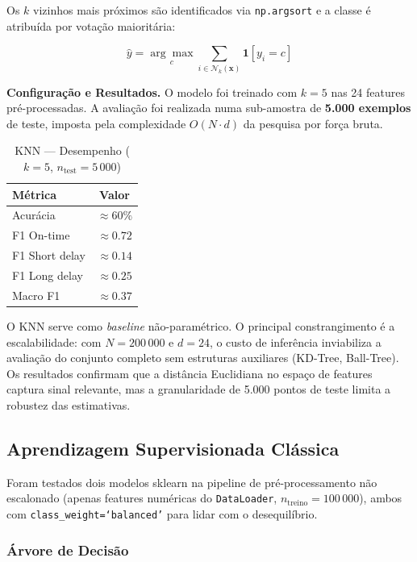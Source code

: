 \documentclass[conference]{IEEEtran}
\begin{document}
Os $k$ vizinhos mais próximos são identificados via \texttt{np.argsort} e a classe é
atribuída por votação maioritária:

\begin{equation}
\hat{y} = \underset{c}{\arg\max} \sum_{i \in \mathcal{N}_k(\mathbf{x})} \mathbf{1}[y_i = c]
\end{equation}

\textbf{Configuração e Resultados.} O modelo foi treinado com $k = 5$ nas 24 features
pré-processadas. A avaliação foi realizada numa sub-amostra de \textbf{5.000 exemplos}
de teste, imposta pela complexidade $O(N \cdot d)$ da pesquisa por força bruta.

\begin{table}[h]
\centering
\caption{KNN — Desempenho ($k=5$, $n_{\text{test}}=5\,000$)}
\label{tab:knn}
\begin{tabular}{lc}
\toprule
\textbf{Métrica} & \textbf{Valor} \\
\midrule
Acurácia       & $\approx 60\%$ \\
F1 On-time     & $\approx 0.72$ \\
F1 Short delay & $\approx 0.14$ \\
F1 Long delay  & $\approx 0.25$ \\
Macro F1       & $\approx 0.37$ \\
\bottomrule
\end{tabular}
\end{table}

O KNN serve como \textit{baseline} não-paramétrico. O principal constrangimento é a
escalabilidade: com $N = 200\,000$ e $d = 24$, o custo de inferência inviabiliza a
avaliação do conjunto completo sem estruturas auxiliares (KD-Tree, Ball-Tree). Os
resultados confirmam que a distância Euclidiana no espaço de features captura sinal
relevante, mas a granularidade de 5.000 pontos de teste limita a robustez das estimativas.

\subsection{Aprendizagem Supervisionada Clássica}

Foram testados dois modelos sklearn na pipeline de pré-processamento não escalonado
(apenas features numéricas do \texttt{DataLoader}, $n_{\text{treino}} = 100\,000$),
ambos com \texttt{class\_weight=`balanced'} para lidar com o desequilíbrio.

\subsubsection{Árvore de Decisão}
\end{document}
